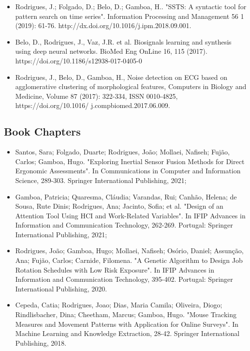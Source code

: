 \begin{itemize}
\item Rodrigues, J.; Folgado, D.; Belo, D.; Gamboa, H.. "SSTS: A syntactic tool for pattern search on time series". Information Processing and Management 56 1 (2019): 61-76. http://dx.doi.org/10.1016/j.ipm.2018.09.001.

\item Belo, D., Rodrigues, J., Vaz, J.R. et al. Biosignals learning and synthesis using deep neural networks. BioMed Eng OnLine 16, 115 (2017). https://doi.org/10.1186/s12938-017-0405-0

\item Rodrigues, J., Belo, D., Gamboa, H., Noise detection on ECG based on agglomerative clustering of morphological features, Computers in Biology and Medicine, Volume 87 (2017): 322-334, ISSN 0010-4825, https://doi.org/10.1016/ j.compbiomed.2017.06.009.

\end{itemize}

\subsection{Book Chapters}

\begin{itemize}
\item Santos, Sara; Folgado, Duarte; Rodrigues, João; Mollaei, Nafiseh; Fujão, Carlos; Gamboa, Hugo. "Exploring Inertial Sensor Fusion Methods for Direct Ergonomic Assessments". In Communications in Computer and Information Science, 289-303. Springer International Publishing, 2021;

\item Gamboa, Patricia; Quaresma, Cláudia; Varandas, Rui; Canhão, Helena; de Sousa, Rute Dinis; Rodrigues, Ana; Jacinto, Sofia; et al. "Design of an Attention Tool Using HCI and Work-Related Variables". In IFIP Advances in Information and Communication Technology, 262-269. Portugal: Springer International Publishing, 2021;

\item Rodrigues, João; Gamboa, Hugo; Mollaei, Nafiseh; Osório, Daniel; Assunção, Ana; Fujão, Carlos; Carnide, Filomena. "A Genetic Algorithm to Design Job Rotation Schedules with Low Risk Exposure". In IFIP Advances in Information and Communication Technology, 395-402. Portugal: Springer International Publishing, 2020.

\item Cepeda, Catia; Rodrigues, Joao; Dias, Maria Camila; Oliveira, Diogo; Rindlisbacher, Dina; Cheetham, Marcus; Gamboa, Hugo. "Mouse Tracking Measures and Movement Patterns with Application for Online Surveys". In Machine Learning and Knowledge Extraction, 28-42. Springer International Publishing, 2018.

\end{itemize}

